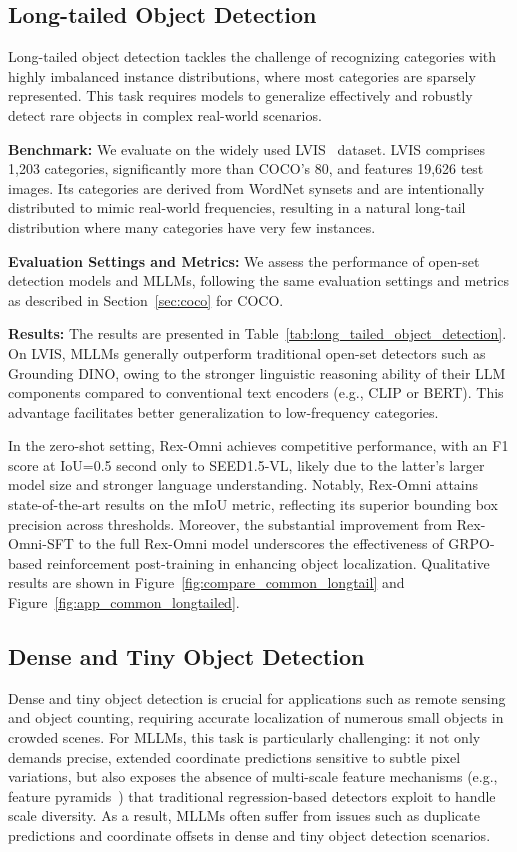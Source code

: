 \subsection{Long-tailed Object Detection}
Long-tailed object detection tackles the challenge of recognizing categories with highly imbalanced instance distributions, where most categories are sparsely represented. This task requires models to generalize effectively and robustly detect rare objects in complex real-world scenarios.

\textbf{Benchmark: }We evaluate on the widely used LVIS~\cite{gupta2019lvis} dataset. LVIS comprises 1,203 categories, significantly more than COCO's 80, and features 19,626 test images.  Its categories are derived from WordNet synsets and are intentionally distributed to mimic real-world frequencies, resulting in a natural long-tail distribution where many categories have very few instances. 

\textbf{Evaluation Settings and Metrics: }We assess the performance of open-set detection models and MLLMs, following the same evaluation settings and metrics as described in Section~\ref{sec:coco} for COCO.



\textbf{Results: }The results are presented in Table~\ref{tab:long_tailed_object_detection}. On LVIS, MLLMs generally outperform traditional open-set detectors such as Grounding DINO, owing to the stronger linguistic reasoning ability of their LLM components compared to conventional text encoders (e.g., CLIP or BERT). This advantage facilitates better generalization to low-frequency categories.

In the zero-shot setting, Rex-Omni achieves competitive performance, with an F1 score at IoU=0.5 second only to SEED1.5-VL, likely due to the latter’s larger model size and stronger language understanding. Notably, Rex-Omni attains state-of-the-art results on the mIoU metric, reflecting its superior bounding box precision across thresholds. Moreover, the substantial improvement from Rex-Omni-SFT to the full Rex-Omni model underscores the effectiveness of GRPO-based reinforcement post-training in enhancing object localization. Qualitative results are shown in Figure~\ref{fig:compare_common_longtail} and Figure~\ref{fig:app_common_longtailed}.

\subsection{Dense and Tiny Object Detection}
\label{sec:dense}
Dense and tiny object detection is crucial for applications such as remote sensing and object counting, requiring accurate localization of numerous small objects in crowded scenes. For MLLMs, this task is particularly challenging: it not only demands precise, extended coordinate predictions sensitive to subtle pixel variations, but also exposes the absence of multi-scale feature mechanisms (e.g., feature pyramids~\cite{lin2017feature}) that traditional regression-based detectors exploit to handle scale diversity. As a result, MLLMs often suffer from issues such as duplicate predictions and coordinate offsets in dense and tiny object detection scenarios.
 
